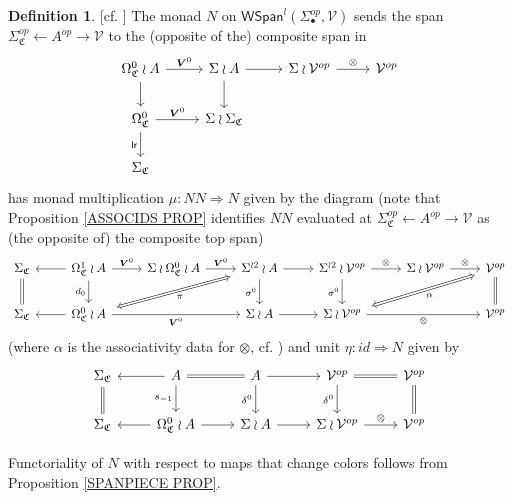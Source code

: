 \documentclass[a4paper,10pt
,draft
]{article}%
\numberwithin{equation}{section}
\numberwithin{figure}{section}
\theoremstyle{definition} %
\newtheorem{definition}[equation]{Definition}%
\newcommand{\V}{\ensuremath{\mathcal V}}
\newcommand{\1}{\ensuremath{\mathbbm 1}}%
\begin{document}
\begin{definition}\label{NCOLOR DEF}
	[cf. \cite[Def. 4.15]{BP_geo}]
	The monad $N$ on 
	$\mathsf{WSpan}^l(\Sigma_{\bullet}^{op},\mathcal{V})$
	sends the span 
	$\Sigma^{op}_{\mathfrak{C}} \leftarrow A^{op} \to \mathcal{V}$
	to the (opposite of the) composite span in
	\begin{equation}\label{NCOLOR EQ}
	\begin{tikzcd}
	\Omega^0_{\mathfrak{C}} \wr A \ar{r}{\boldsymbol{V}^0} \ar{d} &
	\Sigma \wr A  \ar{d} \ar{r} &
	\Sigma \wr \mathcal{V}^{op} \ar{r}{\otimes} &
	\mathcal{V}^{op}
	\\
	\Omega^0_{\mathfrak{C}} \ar{r}{\boldsymbol{V}^0} \arrow[d, "\mathsf{lr}"'] &
	\Sigma \wr \Sigma_{\mathfrak{C}} 
	\\
	\Sigma_{\mathfrak{C}}
	\end{tikzcd}
	\end{equation}
	has monad multiplication
	$\mu \colon N N
	\Rightarrow 
	N$ given by the diagram
	(note that Proposition \ref{ASSOCIDS PROP} identifies 
	$NN$ evaluated at 
	$\Sigma^{op}_{\mathfrak{C}} \leftarrow A^{op} \to \V$
	as (the opposite of) the composite top span)
	\begin{equation}\label{NMONMULTTR EQ}
	\begin{tikzcd}
	\Sigma_{\mathfrak{C}} \ar[equal]{d}&
	\Omega^1_{\mathfrak{C}} \wr A \ar{l} \arrow[r, "\boldsymbol{V}^0"] \ar{d}[swap]{d_0}&
	\Sigma \wr \Omega^0_{\mathfrak{C}} \wr A \arrow[r, "\boldsymbol{V}^0"] &
	|[alias=U]|
	\Sigma^{\wr 2} \wr A \ar{r} \ar{d}[swap]{\sigma^0} &
	\Sigma^{\wr 2} \wr \mathcal{V}^{op} \ar{r}{\otimes} \ar{d}[swap]{\sigma^0} &
	\Sigma \wr \mathcal{V}^{op} \ar{r}{\otimes} &
	|[alias=UU]|
	\mathcal{V}^{op} \ar[equal]{d}
	\\
	\Sigma_{\mathfrak{C}} &
	|[alias=V]|
	\Omega^0_{\mathfrak{C}} \wr A \ar{l} \ar{rr}[swap]{\boldsymbol{V}^0} & &
	\Sigma \wr A \ar{r} &
	|[alias=VV]|
	\Sigma \wr \mathcal{V}^{op} \ar{rr}[swap]{\otimes} & &
	\mathcal{V}^{op}
	\arrow[Leftrightarrow, from=V, to=U,shorten >=0.15cm,shorten <=0.15cm
	,swap,"\pi"
	]
	\arrow[Leftrightarrow, from=VV, to=UU,shorten >=0.15cm,shorten <=0.15cm,swap,"\alpha"
	]
	\end{tikzcd}
	\end{equation}
	(where $\alpha$ is the associativity data for
	$\otimes$, cf. \cite[(2.14)]{BP_geo})
	and unit
	$\eta \colon id \Rightarrow N$ given by
	\begin{equation}\label{NMONIDTR EQ}
	\begin{tikzcd}
	\Sigma_{\mathfrak{C}} \ar[equal]{d} & 
	A \ar{d}[swap]{s_{-1}} \ar{l} \ar[equal]{r} &
	A \ar{d}[swap]{\delta^0} \ar{r} &
	\mathcal{V}^{op} \ar{d}[swap]{\delta^0} \ar[equal]{r} &
	\mathcal{V}^{op} \ar[equal]{d}
	\\
	\Sigma_{\mathfrak{C}} &
	\Omega^0_{\mathfrak{C}} \wr A \ar{l} \ar{r} &
	\Sigma \wr A \ar{r} &
	\Sigma \wr \mathcal{V}^{op} \ar{r}{\otimes} &
	\mathcal{V}^{op}
	\end{tikzcd}
	\end{equation}
	
	Functoriality of $N$ with respect to maps that change colors follows from Proposition \ref{SPANPIECE PROP}.
\end{definition}
\end{document}
